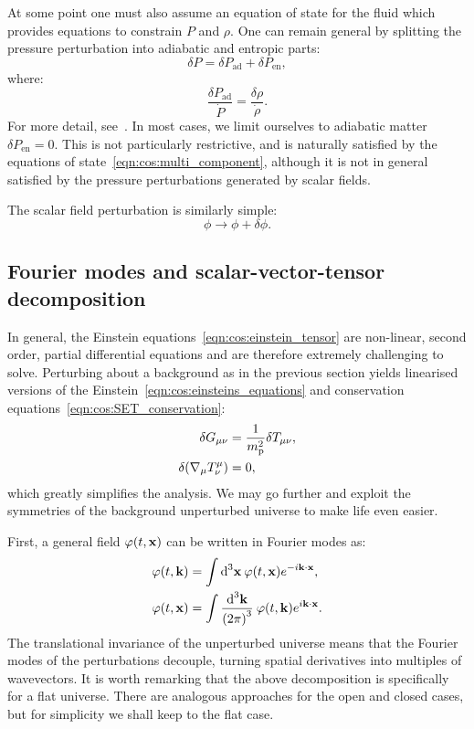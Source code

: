At some point one must also assume an equation of state for the fluid which provides equations to constrain \(P\) and \(\rho\). One can remain general by splitting the pressure perturbation into adiabatic and entropic parts:
\begin{equation}
  \delta P = \delta P_\mathrm{ad} + \delta P_\mathrm{en},
  \label{eqn:cos:adiabatic_entropic}
\end{equation} 
where:
\begin{equation}
  \frac{\delta P_\mathrm{ad}}{\dot{P}} = \frac{\delta\rho}{\dot{\rho}}.
  \label{eqn:cos:adiabatic}
\end{equation} 
For more detail, see~\citet[p.~48]{Baumann+2009}. 
In most cases, we limit ourselves to adiabatic matter \(\delta P_\mathrm{en}=0\).
This is not particularly restrictive, and is naturally satisfied by the equations of state~\eqref{eqn:cos:multi_component}, although it is not in general satisfied by the pressure perturbations generated by scalar fields.

The scalar field perturbation is similarly simple:
\begin{equation}
  \phi \rightarrow \phi + \delta\phi.
\end{equation}

\subsection{Fourier modes and scalar-vector-tensor decomposition}
In general, the Einstein equations~\eqref{eqn:cos:einstein_tensor} are non-linear, second order, partial differential equations and are therefore extremely challenging to solve. Perturbing about a background as in the previous section yields linearised versions of the Einstein~\eqref{eqn:cos:einsteins_equations} and conservation equations~\eqref{eqn:cos:SET_conservation}:
\begin{align}
  \delta G_{\mu\nu} &= \frac{1}{\m^2}\delta T_{\mu\nu},
  \label{eqn:cos:einsteins_equations_perturb} \\
  \delta (\nabla_\mu T^{\mu}_{\nu}) &=0,
  \label{eqn:cos:SET_conservation_perturb}
\end{align}
which greatly simplifies the analysis.  
We may go further and exploit the symmetries of the background unperturbed universe to make life even easier.

First, a general field \(\varphi(t,\vx)\) can be written in Fourier modes as:
\begin{align}
  \varphi(t,\vk) &= \int \d[3]{\vx}\: \varphi(t,\vx) e^{-i\vk \cdot \vx},\\
  \varphi(t,\vx) &= \int \frac{\d[3]{\vk}}{{(2\pi)}^3}\: \varphi(t,\vk) e^{i\vk \cdot \vx}.
\end{align}
The translational invariance of the unperturbed universe means that the Fourier modes of the perturbations decouple, turning spatial derivatives into multiples of wavevectors. 
It is worth remarking that the above decomposition is specifically for a flat universe. There are analogous approaches for the open and closed cases, but for simplicity we shall keep to the flat case. 


